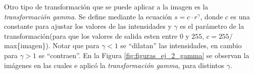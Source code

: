 \documentclass[11pt, twocolumn]{article}
\begin{document}
Otro tipo de transformación que se puede aplicar a la imagen es la \textit{transformación gamma}. Se define mediante la ecuación $s = c \cdot r^{\gamma}$, donde $c$ es una constante para ajustar los valores de las intensidades y $\gamma$ es el parámetro de la transformación(para que los valores de salida esten entre $0$ y $255$, $c = 255/$max\{imagen\}). Notar que para $\gamma < 1$ se ``dilatan'' las intensidades, en cambio para $\gamma > 1$ se ``contraen''. En la Figura \ref{fig:figuras_ej_2_gamma} se observan la imágenes en las cuales e aplicó la \textit{transformación gamma}, para distintos $\gamma$.

\begin{figure}[H]
  \centering
  \hfill
  \hfill
  \hfill
  \hfill

\end{figure}
\end{document}
